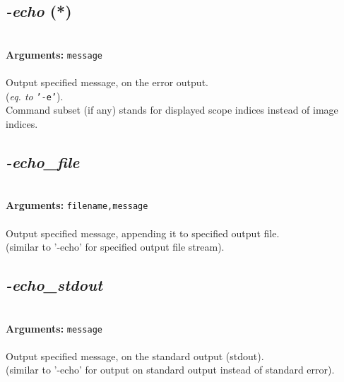 \documentclass[a4paper,11pt,twoside]{book}
\begin{document}
\subsection{\emph{-echo} (*)}\vspace*{-0.5em}
~\\\textbf{Arguments: } 
{\small \texttt{message}}\\~\\
Output specified message, on the error output.
~\\(\emph{eq. to} {\small \texttt{'-e'}}).
~\\Command subset (if any) stands for displayed scope indices instead of image indices.


\subsection{\emph{-echo\_file} }\vspace*{-0.5em}
~\\\textbf{Arguments: } 
{\small \texttt{filename,message}}\\~\\
Output specified message, appending it to specified output file.
~\\(similar to '-echo' for specified output file stream).


\subsection{\emph{-echo\_stdout} }\vspace*{-0.5em}
~\\\textbf{Arguments: } 
{\small \texttt{message}}\\~\\
Output specified message, on the standard output (stdout).
~\\(similar to '-echo' for output on standard output instead of standard error).
\end{document}
